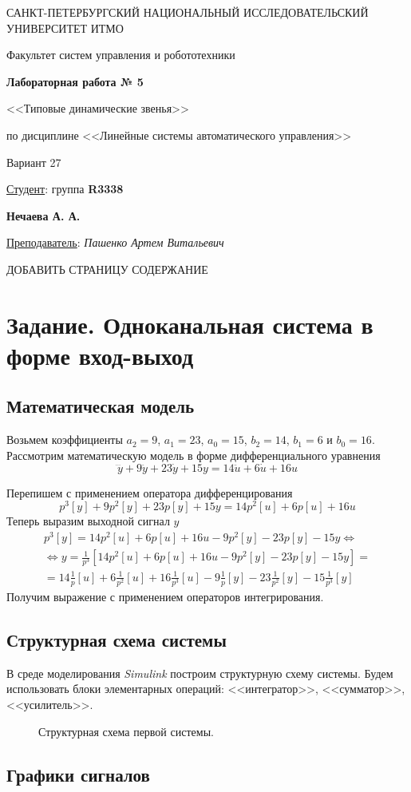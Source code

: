 \documentclass[a5paper, 10pt]{article}
\theoremstyle{definition}
\theoremstyle{plain}
\theoremstyle{remark}
\newcommand*{\titlePage}{
	\thispagestyle{title}
	\begingroup
	\begin{center}
		\vspace*{6ex}
		
		{\small
			САНКТ-ПЕТЕРБУРГСКИЙ НАЦИОНАЛЬНЫЙ ИССЛЕДОВАТЕЛЬСКИЙ УНИВЕРСИТЕТ ИТМО	
		}
		
		\vspace*{2ex}
		
		{\normalsize
			Факультет систем управления и робототехники
		}
		
		\vspace*{15ex}
		
		{\Large \bfseries 
			Лабораторная работа № 5
		}
\vspace*{2ex}
	{\Large \bfseries 
			
<<Типовые динамические звенья>>
		}
\vspace*{2ex}
		
		{\normalsize
			по дисциплине <<Линейные системы автоматического управления>>
		}
\vspace*{2ex}
	{\Large \bfseries 
			
Вариант 27
		}

	\end{center}
	\vspace*{20ex}
	\begin{flushright}
		{\large 
			\underline{Студент}: группа \textbf{R3338}\\
			\begin{flushright}
				\textbf{Нечаева А. А.}\\
			\end{flushright}
		}
		
		\vspace*{5ex}
		
		{\large 
			\underline{Преподаватель}: \textit{Пашенко Артем Витальевич}
		}
	\end{flushright}	
	\newpage
	\setcounter{page}{1}
	\endgroup}
\begin{document}
	\titlePage
	\pagestyle{style}
\newpage

ДОБАВИТЬ СТРАНИЦУ СОДЕРЖАНИЕ

\section{Задание. Одноканальная система в форме вход-выход}
\subsection{Математическая модель}
Возьмем коэффициенты $a_2 = 9$, $a_1 = 23$, $a_0 = 15$, $b_2 = 14$, $b_1 = 6$ и $b_0 = 16$. Рассмотрим математическую модель в форме дифференциального уравнения
\begin{equation}
\dddot{y} + 9\ddot{y} + 23 \dot{y} + 15 y = 14 \ddot{u} + 6 \dot{u} + 16 u
\end{equation}

Перепишем с применением оператора дифференцирования
\begin{equation}
p^3[y] + 9p^2[y] + 23 p[y] + 15 y = 14 p^2[u] + 6 p[u] + 16 u
\end{equation}
Теперь выразим выходной сигнал $y$
\begin{multline}
p^3[y] = 14 p^2[u] + 6 p[u] + 16 u - 9p^2[y] - 23 p[y] - 15 y  \Leftrightarrow \\
 \Leftrightarrow y = \frac{1}{p^3} \left[ 14 p^2[u] + 6 p[u] + 16 u - 9p^2[y] - 23 p[y] - 15 y \right] = \\
= 14 \frac{1}{p}[u] + 6 \frac{1}{p^2}[u] + 16 \frac{1}{p^3}[u] - 9 \frac{1}{p}[y] - 23 \frac{1}{p^2}[y] - 15 \frac{1}{p^3}[y]
\end{multline}
Получим выражение с применением операторов интегрирования. 

\subsection{Структурная схема системы}
В среде моделирования \textit{Simulink} построим структурную схему системы. Будем использовать блоки элементарных операций: <<интегратор>>, <<сумматор>>, <<усилитель>>.

\begin{figure}[h]
\caption{Структурная схема первой системы.}
\end{figure}

\newpage
\subsection{Графики сигналов}
\end{document}

